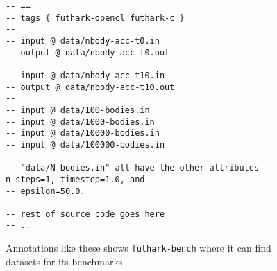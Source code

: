 \begin{figure}[H]
  \centering
\begin{lstlisting}[language=Futhark, basicstyle=\footnotesize\ttfamily]
-- ==
-- tags { futhark-opencl futhark-c }
--
-- input @ data/nbody-acc-t0.in
-- output @ data/nbody-acc-t0.out
--
-- input @ data/nbody-acc-t10.in
-- output @ data/nbody-acc-t10.out
--
-- input @ data/100-bodies.in
-- input @ data/1000-bodies.in
-- input @ data/10000-bodies.in
-- input @ data/100000-bodies.in

-- "data/N-bodies.in" all have the other attributes n_steps=1, timestep=1.0, and
-- epsilon=50.0.

-- rest of source code goes here
-- ..
\end{lstlisting}
  \caption{Annotations like these shows \texttt{futhark-bench} where it can find
    datasets for its benchmarks}
  \label{fig:nbodyannotations}
\end{figure}


